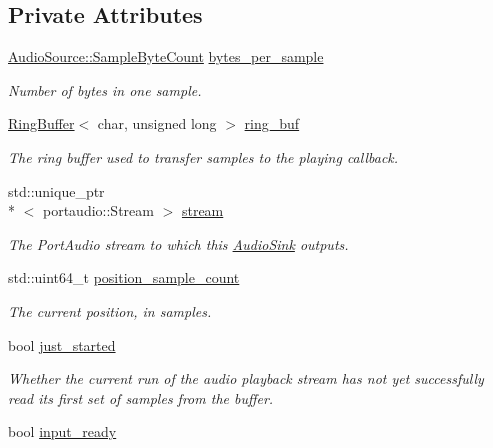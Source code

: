 \subsection*{Private Attributes}
\begin{DoxyCompactItemize}
\item 
\hypertarget{classAudioSink_a5eab0f7111187c0416feb542010e4a2e}{\hyperlink{classAudioSource_a1c8138ec9ffb9fd1394d0ad0782d60fa}{Audio\+Source\+::\+Sample\+Byte\+Count} \hyperlink{classAudioSink_a5eab0f7111187c0416feb542010e4a2e}{bytes\+\_\+per\+\_\+sample}}\label{classAudioSink_a5eab0f7111187c0416feb542010e4a2e}

\begin{DoxyCompactList}\small\item\em Number of bytes in one sample. \end{DoxyCompactList}\item 
\hypertarget{classAudioSink_a87184f85d6cfcc7310043b877caeaee2}{\hyperlink{classRingBuffer}{Ring\+Buffer}$<$ char, unsigned long $>$ \hyperlink{classAudioSink_a87184f85d6cfcc7310043b877caeaee2}{ring\+\_\+buf}}\label{classAudioSink_a87184f85d6cfcc7310043b877caeaee2}

\begin{DoxyCompactList}\small\item\em The ring buffer used to transfer samples to the playing callback. \end{DoxyCompactList}\item 
\hypertarget{classAudioSink_aac90e7d95e98ac08b7c661a301eff1b2}{std\+::unique\+\_\+ptr\\*
$<$ portaudio\+::\+Stream $>$ \hyperlink{classAudioSink_aac90e7d95e98ac08b7c661a301eff1b2}{stream}}\label{classAudioSink_aac90e7d95e98ac08b7c661a301eff1b2}

\begin{DoxyCompactList}\small\item\em The Port\+Audio stream to which this \hyperlink{classAudioSink}{Audio\+Sink} outputs. \end{DoxyCompactList}\item 
\hypertarget{classAudioSink_ac3403a492b8aba8d483961d1ec09fa26}{std\+::uint64\+\_\+t \hyperlink{classAudioSink_ac3403a492b8aba8d483961d1ec09fa26}{position\+\_\+sample\+\_\+count}}\label{classAudioSink_ac3403a492b8aba8d483961d1ec09fa26}

\begin{DoxyCompactList}\small\item\em The current position, in samples. \end{DoxyCompactList}\item 
bool \hyperlink{classAudioSink_a00cbaaf2b4fcf5d9acb614b909234196}{just\+\_\+started}
\begin{DoxyCompactList}\small\item\em Whether the current run of the audio playback stream has not yet successfully read its first set of samples from the buffer. \end{DoxyCompactList}\item 
\hypertarget{classAudioSink_ad644a3477077e87f76cd24c9cb268f30}{bool \hyperlink{classAudioSink_ad644a3477077e87f76cd24c9cb268f30}{input\+\_\+ready}}\label{classAudioSink_ad644a3477077e87f76cd24c9cb268f30}


\end{DoxyCompactItemize}
